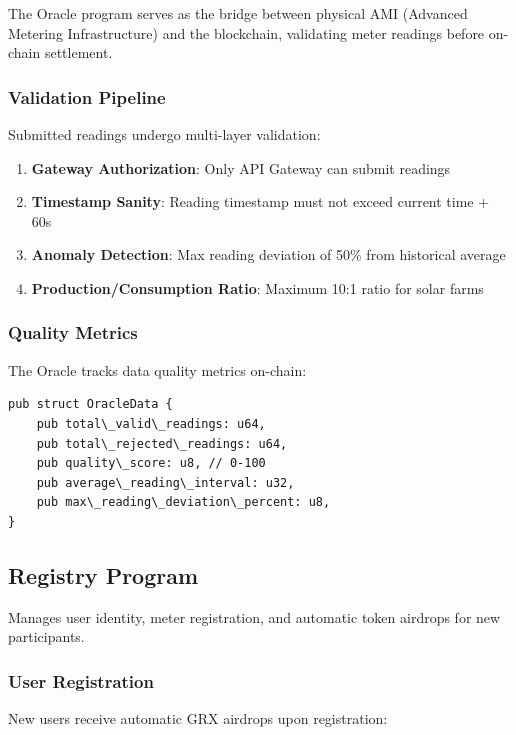 \documentclass[conference]{IEEEtran}
\begin{document}
{The Oracle program serves as the bridge between physical AMI (Advanced Metering Infrastructure) and the blockchain, validating meter readings before on-chain settlement.

\subsubsection{Validation Pipeline}

Submitted readings undergo multi-layer validation:

\begin{enumerate}
    \item \textbf{Gateway Authorization}: Only API Gateway can submit readings
    \item \textbf{Timestamp Sanity}: Reading timestamp must not exceed current time + 60s
    \item \textbf{Anomaly Detection}: Max reading deviation of 50\% from historical average
    \item \textbf{Production/Consumption Ratio}: Maximum 10:1 ratio for solar farms
\end{enumerate}

\subsubsection{Quality Metrics}

The Oracle tracks data quality metrics on-chain:

\begin{lstlisting}[caption={Oracle Data Quality Tracking}]
pub struct OracleData {
    pub total\_valid\_readings: u64,
    pub total\_rejected\_readings: u64,
    pub quality\_score: u8, // 0-100
    pub average\_reading\_interval: u32,
    pub max\_reading\_deviation\_percent: u8,
}
\end{lstlisting}

\subsection{Registry Program}

Manages user identity, meter registration, and automatic token airdrops for new participants.

\subsubsection{User Registration}

New users receive automatic GRX airdrops upon registration:

}
\end{document}
